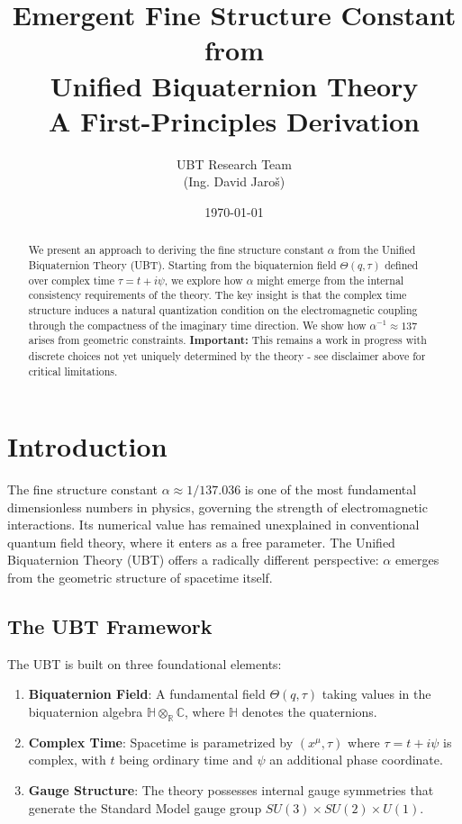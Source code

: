 \documentclass[12pt, a4paper]{article}
\title{\textbf{Emergent Fine Structure Constant from \\
Unified Biquaternion Theory}\\
\large A First-Principles Derivation}
\author{UBT Research Team \\ \small(Ing. David Jaroš)}
\date{\today}
\theoremstyle{definition}
\theoremstyle{remark}
\begin{document}
\maketitle


\AlphaDerivationDisclaimer

\begin{abstract}
We present an approach to deriving the fine structure constant $\alpha$ from the Unified Biquaternion Theory (UBT). Starting from the biquaternion field $\Theta(q,\tau)$ defined over complex time $\tau = t + i\psi$, we explore how $\alpha$ might emerge from the internal consistency requirements of the theory. The key insight is that the complex time structure induces a natural quantization condition on the electromagnetic coupling through the compactness of the imaginary time direction. We show how $\alpha^{-1} \approx 137$ arises from geometric constraints. \textbf{Important:} This remains a work in progress with discrete choices not yet uniquely determined by the theory - see disclaimer above for critical limitations.
\end{abstract}

\tableofcontents
\newpage

\section{Introduction}

The fine structure constant $\alpha \approx 1/137.036$ is one of the most fundamental dimensionless numbers in physics, governing the strength of electromagnetic interactions. Its numerical value has remained unexplained in conventional quantum field theory, where it enters as a free parameter. The Unified Biquaternion Theory (UBT) offers a radically different perspective: $\alpha$ emerges from the geometric structure of spacetime itself.

\subsection{The UBT Framework}

The UBT is built on three foundational elements:

\begin{enumerate}
\item \textbf{Biquaternion Field}: A fundamental field $\Theta(q,\tau)$ taking values in the biquaternion algebra $\mathbb{H} \otimes_{\mathbb{R}} \mathbb{C}$, where $\mathbb{H}$ denotes the quaternions.

\item \textbf{Complex Time}: Spacetime is parametrized by $(x^\mu, \tau)$ where $\tau = t + i\psi$ is complex, with $t$ being ordinary time and $\psi$ an additional phase coordinate.

\item \textbf{Gauge Structure}: The theory possesses internal gauge symmetries that generate the Standard Model gauge group $SU(3) \times SU(2) \times U(1)$.
\end{enumerate}
\end{document}
